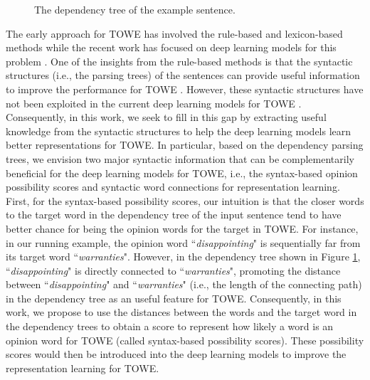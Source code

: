 \documentclass[11pt,a4paper]{article}
\begin{document}
\begin{figure}
\small
\centering
{}
\caption{\small The dependency tree of the example sentence.} \label{parse}
\end{figure}



The early approach for TOWE has involved the rule-based and lexicon-based methods \cite{hu2004mining,zhuang2006movie} while the recent work has focused on deep learning models for this problem \cite{fan2019target,wu2020latent}. One of the insights from the rule-based methods is that the syntactic structures (i.e., the parsing trees) of the sentences can provide useful information to improve the performance for TOWE \citep{zhuang2006movie}. However, these syntactic structures have not been exploited in the current deep learning models for TOWE \citep{fan2019target,wu2020latent}. Consequently, in this work, we seek to fill in this gap by extracting useful knowledge from the syntactic structures to help the deep learning models learn better representations for TOWE. In particular, based on the dependency parsing trees, we envision two major syntactic information that can be complementarily beneficial for the deep learning models for TOWE, i.e., the syntax-based opinion possibility scores and syntactic word connections for representation learning. First, for the syntax-based possibility scores, our intuition is that the closer words to the target word in the dependency tree of the input sentence tend to have better chance for being the opinion words for the target in TOWE. For instance, in our running example, the opinion word ``\textit{disappointing}" is sequentially far from its target word ``\textit{warranties}". However, in the dependency tree shown in Figure \ref{parse}, ``\textit{disappointing}" is directly connected to ``\textit{warranties}", promoting the distance between ``\textit{disappointing}" and ``\textit{warranties}" (i.e., the length of the connecting path) in the dependency tree as an useful feature for TOWE. Consequently, in this work, we propose to use the distances between the words and the target word in the dependency trees to obtain a score to represent how likely a word is an opinion word for TOWE (called syntax-based possibility scores). These possibility scores would then be introduced into the deep learning models to improve the representation learning for TOWE.
\end{document}

